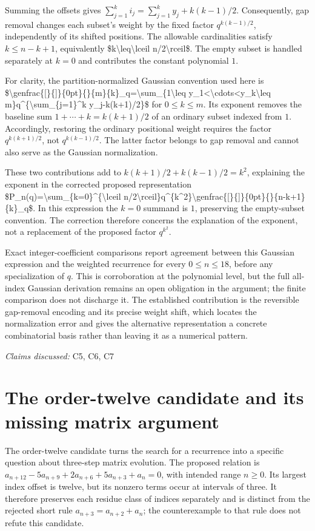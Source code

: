 \documentclass[11pt]{article}
\begin{document}
Summing the offsets gives $\sum_{j=1}^k i_j=\sum_{j=1}^k y_j+k(k-1)/2$. Consequently, gap removal changes each subset's weight by the fixed factor $q^{k(k-1)/2}$, independently of its shifted positions. The allowable cardinalities satisfy $k\leq n-k+1$, equivalently \$k\textbackslash{}leq\textbackslash{}lceil n/2\textbackslash{}rceil\$. The empty subset is handled separately at $k=0$ and contributes the constant polynomial $1$.

For clarity, the partition-normalized Gaussian convention used here is \$\textbackslash{}genfrac\{[\}\{]\}\{0pt\}\{\}\{m\}\{k\}\_q=\textbackslash{}sum\_\{1\textbackslash{}leq y\_1\textless{}\textbackslash{}cdots\textless{}y\_k\textbackslash{}leq m\}q\textasciicircum{}\{\textbackslash{}sum\_\{j=1\}\textasciicircum{}k y\_j-k(k+1)/2\}\$ for $0\leq k\leq m$. Its exponent removes the baseline sum $1+\cdots+k=k(k+1)/2$ of an ordinary subset indexed from $1$. Accordingly, restoring the ordinary positional weight requires the factor $q^{k(k+1)/2}$, not $q^{k(k-1)/2}$. The latter factor belongs to gap removal and cannot also serve as the Gaussian normalization.

These two contributions add to $k(k+1)/2+k(k-1)/2=k^2$, explaining the exponent in the corrected proposed representation \$P\_n(q)=\textbackslash{}sum\_\{k=0\}\textasciicircum{}\{\textbackslash{}lceil n/2\textbackslash{}rceil\}q\textasciicircum{}\{k\textasciicircum{}2\}\textbackslash{}genfrac\{[\}\{]\}\{0pt\}\{\}\{n-k+1\}\{k\}\_q\$. In this expression the $k=0$ summand is $1$, preserving the empty-subset convention. The correction therefore concerns the explanation of the exponent, not a replacement of the proposed factor $q^{k^2}$.

Exact integer-coefficient comparisons report agreement between this Gaussian expression and the weighted recurrence for every $0\leq n\leq18$, before any specialization of $q$. This is corroboration at the polynomial level, but the full all-index Gaussian derivation remains an open obligation in the argument; the finite comparison does not discharge it. The established contribution is the reversible gap-removal encoding and its precise weight shift, which locates the normalization error and gives the alternative representation a concrete combinatorial basis rather than leaving it as a numerical pattern.

\textit{Claims discussed: }C5, C6, C7
\section{The order-twelve candidate and its missing matrix argument}
The order-twelve candidate turns the search for a recurrence into a specific question about three-step matrix evolution. The proposed relation is $a_{n+12}-5a_{n+9}+2a_{n+6}+5a_{n+3}+a_n=0$, with intended range $n\geq0$. Its largest index offset is twelve, but its nonzero terms occur at intervals of three. It therefore preserves each residue class of indices separately and is distinct from the rejected short rule $a_{n+3}=a_{n+2}+a_n$; the counterexample to that rule does not refute this candidate.
\end{document}
